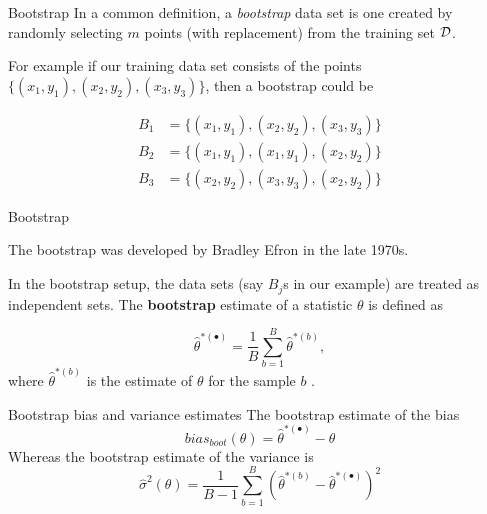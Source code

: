 \documentclass{beamer}
\begin{document}
\begin{frame}{Bootstrap}
	In a common definition, a {\it bootstrap} data set is one created by randomly selecting $m$ points (with replacement) from the training set $\cal{D}$.
	
	For example if our training data set consists of the points $\{(x_1,y_1),(x_2,y_2),(x_3,y_3)\}$, then a bootstrap could be 
	
	\begin{equation*}
		\begin{split}
				B_1&=\{(x_1,y_1),(x_2,y_2),(x_3,y_3)\}\\
				B_2&=\{(x_1,y_1),(x_1,y_1),(x_2,y_2)\} \\
				B_3&=\{(x_2,y_2),(x_3,y_3),(x_2,y_2)\} 
		\end{split}
	\end{equation*}
	 
\end{frame}		

\begin{frame}{Bootstrap}
	
	The bootstrap was developed by Bradley Efron in the late 1970s. 
	
	In the bootstrap setup, the data sets (say $B_j$s in our example) are treated as independent sets. The {\bf bootstrap} estimate of a statistic $\theta$ is defined as
	
	\begin{equation*}
		\hat{\theta}^{*(\bullet)}= \frac{1}{B} \sum_{b=1}^B \hat{\theta}^{*(b)},
	\end{equation*}
where $\hat{\theta}^{*(b)}$ is the estimate of $\theta$ for the sample $b$ .
\end{frame}		

\begin{frame}{Bootstrap bias and variance estimates}
	The bootstrap estimate of the bias 
	\begin{equation*}
		bias_{boot}(\theta)= \hat{\theta}^{*(\bullet)}- \hat{\theta}
	\end{equation*}
	Whereas the bootstrap estimate of the variance is
	\begin{equation*}
		\hat{\sigma}^2 (\theta)= \frac{1}{B-1}\sum_{b=1}^B \left(  \hat{\theta}^{*(b)} - \hat{\theta}^{*(\bullet)} 
		\right)^2
	\end{equation*}
\end{frame}
\end{document}
